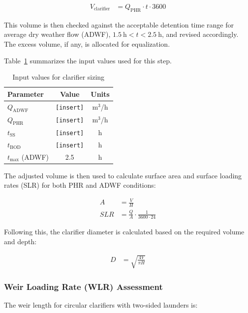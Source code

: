 \documentclass[12pt]{article}
\begin{document}
\begin{align}
V_{\text{clarifier}} &= Q_{\text{PHR}} \cdot t \cdot 3600
\label{eq:clarifier_volume}
\end{align}

This volume is then checked against the acceptable detention time range for average dry weather flow (ADWF), \(1.5~\text{h} < t < 2.5~\text{h}\), and revised accordingly. The excess volume, if any, is allocated for equalization.

Table~\ref{tab:clarifier_inputs} summarizes the input values used for this step.

\begin{table}[h]
\centering
\caption{Input values for clarifier sizing}
\label{tab:clarifier_inputs}
\begin{tabular}{|l|c|c|}
\hline
\textbf{Parameter} & \textbf{Value} & \textbf{Units} \\
\hline
$Q_{\text{ADWF}}$ & \texttt{[insert]} & m$^3$/h \\
$Q_{\text{PHR}}$ & \texttt{[insert]} & m$^3$/h \\
$t_{\text{SS}}$ & \texttt{[insert]} & h \\
$t_{\text{BOD}}$ & \texttt{[insert]} & h \\
$t_{\text{max}}$ (ADWF) & 2.5 & h \\
\hline
\end{tabular}
\end{table}

The adjusted volume is then used to calculate surface area and surface loading rates (SLR) for both PHR and ADWF conditions:

\begin{align}
A &= \frac{V}{H} \\
SLR &= \frac{Q}{A} \cdot \frac{1}{3600 \cdot 24}
\end{align}

Following this, the clarifier diameter is calculated based on the required volume and depth:

\begin{align}
D &= \sqrt{ \frac{4V}{\pi H} }
\end{align}

\subsubsection{Weir Loading Rate (WLR) Assessment}

The weir length for circular clarifiers with two-sided launders is:
\end{document}
